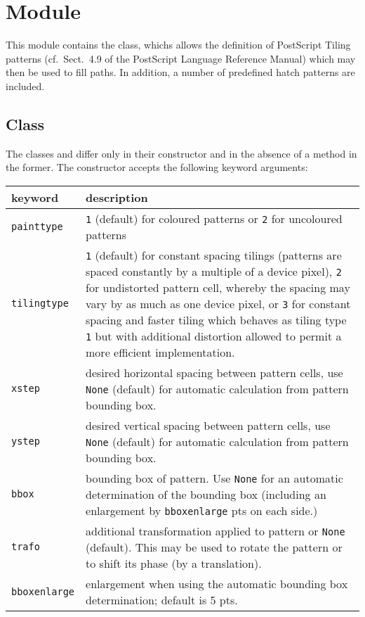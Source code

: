 \chapter{Module }
\label{pattern}


This module contains the  class, whichs allows the definition of PostScript Tiling
patterns (cf.\ Sect.~4.9 of the PostScript Language Reference Manual)
which may then be used to fill paths. In addition, a number of
predefined hatch patterns are included.



\section{Class }

The classes  and  differ only in their
constructor and in the absence of a  method in
the former. The  constructor accepts the following
keyword arguments:

\medskip
\begin{tabularx}{\linewidth}{l>{\raggedright\arraybackslash}X}
keyword&description\\
\hline
\texttt{painttype}&\texttt{1} (default) for coloured patterns or
\texttt{2} for uncoloured patterns\\
\texttt{tilingtype}&\texttt{1} (default) for constant spacing tilings
(patterns are spaced constantly by a multiple of a device pixel),
\texttt{2} for undistorted pattern cell, whereby the spacing may vary
by as much as one device pixel, or \texttt{3} for constant spacing and
faster tiling which behaves as tiling type \texttt{1} but with
additional distortion allowed to permit a more efficient
implementation.\\
\texttt{xstep}&desired horizontal spacing between pattern cells, use
\texttt{None} (default) for automatic calculation from pattern
bounding box.\\
\texttt{ystep}&desired vertical spacing between pattern cells, use
\texttt{None} (default) for automatic calculation from pattern
bounding box.\\
\texttt{bbox}&bounding box of pattern. Use \texttt{None} for an
automatic determination of the bounding box (including an
enlargement by \texttt{bboxenlarge} pts on each side.)\\
\texttt{trafo}&additional transformation applied to pattern or
\texttt{None} (default). This may be used to rotate the pattern or to
shift its phase (by a translation).\\
\texttt{bboxenlarge}&enlargement when using the automatic bounding box
determination; default is 5 pts.
\end{tabularx}
\medskip

